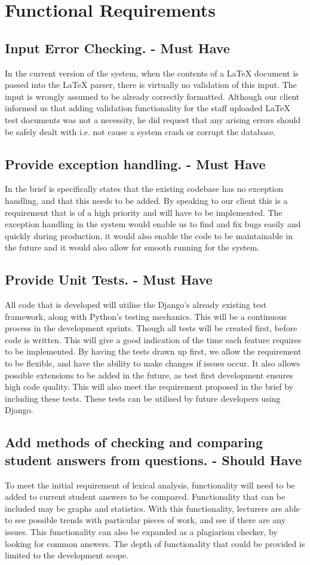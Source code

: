 \documentclass[12pt]{article}
\begin{document}
	\section{Functional Requirements}
	\subsection{Input Error Checking. - Must Have}
	In the current version of the system, when the contents of a LaTeX document is passed into the LaTeX parser, there is virtually no validation of this input. The input is wrongly assumed to be already correctly formatted. Although our client informed us that adding validation functionality for the staff uploaded LaTeX test documents was not a necessity, he did request that any arising errors should be safely dealt with i.e. not cause a system crash or corrupt the database.
	\subsection{Provide exception handling. - Must Have}
	In the brief is specifically states that the existing codebase has no exception handling, and that this needs to be added. By speaking to our client this is a requirement that is of a high priority and will have to be implemented.
The exception handling in the system would enable us to find and fix bugs easily and quickly during production, it would also enable the code to be maintainable in the future and it would also allow for smooth running for the system.

	\subsection{Provide Unit Tests. - Must Have}
	All code that is developed will utilise the Django’s already existing test framework, along with Python’s testing mechanics. This will be a continuous process in the development sprints. Though all tests will be created first, before code is written. This will give a good indication of the time each feature requires to be implemented. By having the tests drawn up first, we allow the requirement to be flexible, and have the ability to make changes if issues occur. It also allows possible extensions to be added in the future, as test first development ensures high code quality. This will also meet the requirement proposed in the brief by including these tests. These tests can be utilised by future developers using Django.
	
	
	\subsection{Add methods of checking and comparing student answers from questions. - Should Have}
	To meet the initial requirement of lexical analysis, functionality will need to be added to current student answers to be compared. Functionality that can be included may be graphs and statistics. With this functionality, lecturers are able to see possible trends with particular pieces of work, and see if there are any issues. This functionality can also be expanded as a plagiarism checker, by looking for common answers. The depth of functionality that could be provided is limited to the development scope.
\end{document}
